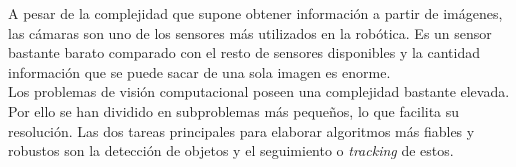 \begin{figure}[h]
  \centering
\end{figure}

A pesar de la complejidad que supone obtener información a partir de imágenes, las cámaras son uno de los sensores más utilizados en la robótica. Es un sensor bastante barato comparado con el resto de sensores disponibles y la cantidad información que se puede sacar de una sola imagen es enorme.\\

Los problemas de visión computacional poseen una complejidad bastante elevada. Por ello se han dividido en subproblemas más pequeños, lo que facilita su resolución. Las dos tareas principales para elaborar algoritmos más fiables y robustos son la detección de objetos y el seguimiento o \textit{tracking} de estos. \\

